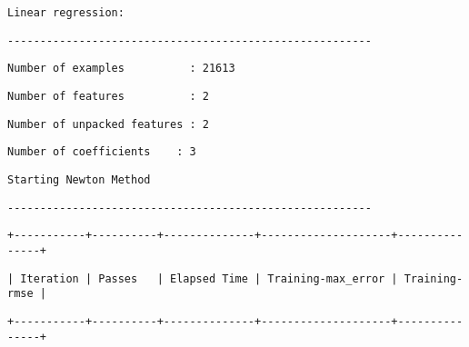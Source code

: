 \documentclass[11pt]{article}
\begin{document}
    
    \begin{verbatim}
Linear regression:
    \end{verbatim}

    
    
    \begin{verbatim}
--------------------------------------------------------
    \end{verbatim}

    
    
    \begin{verbatim}
Number of examples          : 21613
    \end{verbatim}

    
    
    \begin{verbatim}
Number of features          : 2
    \end{verbatim}

    
    
    \begin{verbatim}
Number of unpacked features : 2
    \end{verbatim}

    
    
    \begin{verbatim}
Number of coefficients    : 3
    \end{verbatim}

    
    
    \begin{verbatim}
Starting Newton Method
    \end{verbatim}

    
    
    \begin{verbatim}
--------------------------------------------------------
    \end{verbatim}

    
    
    \begin{verbatim}
+-----------+----------+--------------+--------------------+---------------+
    \end{verbatim}

    
    
    \begin{verbatim}
| Iteration | Passes   | Elapsed Time | Training-max_error | Training-rmse |
    \end{verbatim}

    
    
    \begin{verbatim}
+-----------+----------+--------------+--------------------+---------------+
    \end{verbatim}
\end{document}
